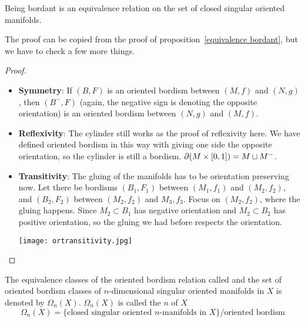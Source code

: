 \documentclass[a4paper,12pt]{article}
\begin{document}
\begin{proposition}\label{oriented eq. rel}
    Being bordant is an equivalence relation on the set of closed singular oriented manifolds.
\end{proposition}

The proof can be copied from the proof of proposition\ \ref{equivalence bordant}, but we have to check a few more things.

\begin{proof}
    \begin{itemize}
        \item \textbf{Symmetry}: If \((B,F)\) is an oriented bordism between \((M,f)\) and \((N,g)\), then \((B^-,F)\) (again, the negative sign is denoting the opposite orientation) is an oriented bordism between \((N,g)\) and \((M,f)\).
        \item \textbf{Reflexivity}: The cylinder still works as the proof of reflexivity here. We have defined oriented bordism in this way with giving one side the opposite orientation, so the cylinder is still a bordism. \(\partial(M\times [0,1])=M\sqcup M^-\).
        \item \textbf{Transitivity}: The gluing of the manifolds has to be orientation preserving now. Let there be bordisms \((B_1,F_1)\) between \((M_1,f_1)\) and \((M_2,f_2)\), and \((B_2,F_2)\) between \((M_2,f_2)\) and \(M_3,f_3\). Focus on \((M_2,f_2)\), where the gluing happens. Since \(M_2\subset B_1\) has negative orientation and \(M_2\subset B_2\) has positive orientation, so the gluing we had before respects the orientation.
        \begin{center}
        \texttt{[image: ortransitivity.jpg]}
        \end{center}
    \end{itemize}
\end{proof}

\begin{definition}
    The equivalence classes of the oriented bordism relation called  and the set of oriented bordism classes of \(n\)-dimensional singular oriented manifolds in \(X\) is denoted by \(\Omega_n(X)\). \(\Omega_n(X)\) is called the \(n\) of \(X\)
    \[\Omega_n(X)=\{\text{closed singular oriented \(n\)-manifolds in } X\}\big/\text{oriented bordism}\]
\end{definition}
\end{document}
